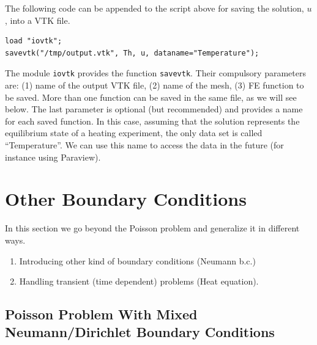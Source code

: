 \documentclass[12pt]{article}
\begin{document}
The following code can be appended to the script above for saving the
solution, $u$, into a VTK file.

\begin{lstlisting}
load "iovtk";
savevtk("/tmp/output.vtk", Th, u, dataname="Temperature");
\end{lstlisting}

The module \texttt{iovtk} provides the function
\texttt{savevtk}. Their compulsory parameters are: (1) name of the
output VTK file, (2) name of the mesh, (3) FE function to be
saved. More than one function can be saved in the same file, as we
will see below. The last parameter is optional (but recommended) and
provides a name for each saved function. In this case, assuming that
the solution represents the equilibrium state of a heating experiment,
the only data set is called ``Temperature''. We can use this name to
access the data in the future (for instance using Paraview).


\section{Other Boundary Conditions}
\label{sec:complex-problems}

In this section we go beyond the Poisson problem and generalize it in
different ways.
\begin{enumerate}
\item Introducing other kind of boundary conditions (Neumann b.c.)
\item Handling transient (time dependent) problems (Heat equation).
\end{enumerate}

\subsection{Poisson Problem With Mixed Neumann/Dirichlet Boundary Conditions}
\label{sec:poisson-problem-with-mixed-bc}
\end{document}
